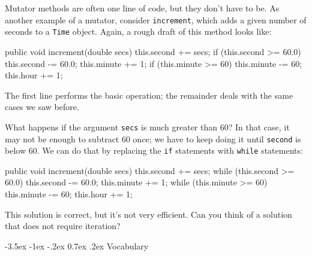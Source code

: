 \documentclass[12pt]{book}
\makeatletter
\theoremstyle{exercise}
\newcommand{\java}[1]{\verb"#1"}
\renewcommand{\section}{\@startsection {section}{1}{\z@}%
    {-3.5ex \@plus -1ex \@minus -.2ex}%
    {0.7ex \@plus.2ex}%
    {\normalfont\Large\bfseries}}
\newcommand{\java}[1]{\lstinline{#1}} %
\makeatother
\begin{document}
Mutator methods are often one line of code, but they don't have to be.
As another example of a mutator, consider \java{increment}, which adds a given number of seconds to a \java{Time} object.
Again, a rough draft of this method looks like:

\begin{code}
    public void increment(double secs) {
        this.second += secs;
        if (this.second >= 60.0) {
            this.second -= 60.0;
            this.minute += 1;
        }
        if (this.minute >= 60) {
            this.minute -= 60;
            this.hour += 1;
        }
    }
\end{code}

The first line performs the basic operation; the remainder deals with the same cases we saw before.

What happens if the argument \java{secs} is much greater than 60?
In that case, it may not be enough to subtract 60 once; we have to keep doing it until \java{second} is below 60.
We can do that by replacing the \java{if} statements with \java{while} statements:

\begin{code}
    public void increment(double secs) {
        this.second += secs;
        while (this.second >= 60.0) {
            this.second -= 60.0;
            this.minute += 1;
        }
        while (this.minute >= 60) {
            this.minute -= 60;
            this.hour += 1;
        }
    }
\end{code}

This solution is correct, but it's not very efficient.
Can you think of a solution that does not require iteration?


\section{Vocabulary}
\end{document}
